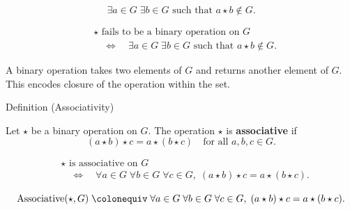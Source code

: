\begin{remark*}
\[
\exists a \in G\;\exists b \in G \text{ such that } a \star b \notin G.
\]
\end{remark*}

\begin{remark*}
\[
\begin{aligned}
&\star \text{ fails to be a binary operation on } G \\
&\quad\Longleftrightarrow\quad
\exists a \in G\;\exists b \in G \text{ such that } a \star b \notin G.
\end{aligned}
\]
\end{remark*}

\begin{remark*}[Interpretation]
A binary operation takes two elements of $G$ and returns another element of $G$.
This encodes closure of the operation within the set.
\end{remark*}


\begin{definitionbox}{Definition (Associativity)}
\begin{definition}[Associativity]
\label{def:algebraic-group-associativity}
Let $\star$ be a binary operation on $G$. The operation $\star$ is
\textbf{associative} if
\[
(a \star b) \star c = a \star (b \star c)
\quad \text{for all } a, b, c \in G.
\]
\end{definition}
\end{definitionbox}

\begin{remark*}
\[
\begin{aligned}
&\star \text{ is associative on } G \\
&\quad\Longleftrightarrow\quad
\forall a \in G\;\forall b \in G\;\forall c \in G,\;
(a \star b) \star c = a \star (b \star c).
\end{aligned}
\]
\end{remark*}

\begin{remark*}
\[
\operatorname{Associative}(\star, G)
\;\colonequiv\;
\forall a \in G\;\forall b \in G\;\forall c \in G,\;
(a \star b) \star c = a \star (b \star c).
\]
\end{remark*}

